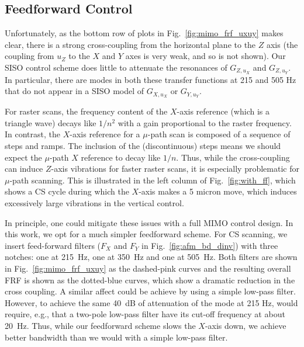 \documentclass[twocolumn,oneside]{IEEEtran/IEEEtran}
\begin{document}

\subsection{Feedforward Control}\label{sec:ff_control}
Unfortunately, as the bottom row of plots in Fig.~\ref{fig:mimo_frf_uxuy}
makes clear, there is a strong cross-coupling from the horizontal
plane to the $Z$ axis (the coupling from $u_Z$ to the $X$ and $Y$ axes
is very weak, and so is not shown). Our SISO control scheme does
little to attenuate the resonances of $G_{Z,u_X}$ and $G_{Z,u_Y}$. In
particular, there are modes in both these transfer functions at 215
and 505 Hz that do not appear in a SISO model of $G_{X,u_X}$ or
$G_{Y,u_Y}$.

For raster scans, the frequency content of the $X$-axis reference
(which is a triangle wave) decays like $1/n^2$ with a gain
proportional to the raster frequency. In contrast, the $X$-axis
reference for a $\mu$-path scan is composed of a sequence of steps and
ramps. The inclusion of the (discontinuous) steps means we should
expect the $\mu$-path $X$ reference to decay like $1/n$. Thus, while
the cross-coupling can induce $Z$-axis vibrations for faster raster
scans, it is especially problematic for $\mu$-path scanning. This is
illustrated in the left column of Fig.~\ref{fig:with_ff}, which shows
a CS cycle during which the $X$-axis makes a 5 micron move, which
induces excessively large vibrations in the vertical control.

In principle, one could mitigate these issues with a full MIMO control
design. In this work, we opt for a much simpler feedforward scheme.
For CS scanning, we insert feed-forward filters ($F_X$ and $F_Y$ in
Fig.~\ref{fig:afm_bd_dinv}) with three notches: one at 215~Hz, one at
350~Hz and one at 505~Hz. Both filters are shown in Fig.~\ref{fig:mimo_frf_uxuy}
as the dashed-pink curves and the resulting overall FRF is shown as the
dotted-blue curves, which show a dramatic reduction in the cross
coupling. A similar affect could be achieve by using a simple low-pass
filter. However, to achieve the same 40~dB of attenuation of the mode
at 215 Hz, would require, e.g., that a two-pole low-pass filter have
its cut-off frequency at about 20~Hz. Thus, while our feedforward
scheme slows the $X$-axis down, we achieve better bandwidth than we
would with a simple low-pass filter.
\end{document}
